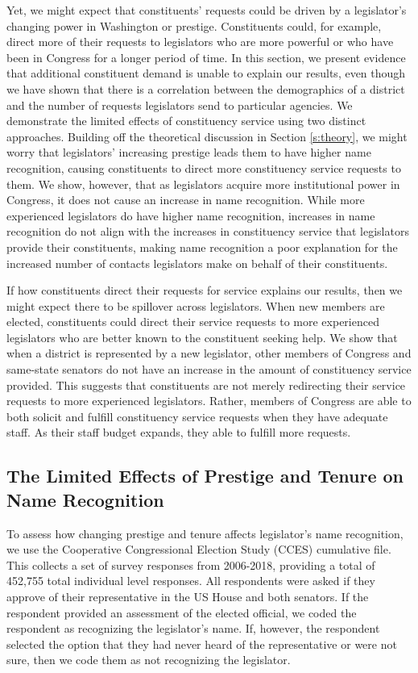 \documentclass[12pt]{article}
\begin{document}
Yet, we might expect that constituents' requests could be driven by a legislator's changing power in Washington or prestige. Constituents could, for example, direct more of their requests to legislators who are more powerful or who have been in Congress for a longer period of time. In this section, we present evidence that additional constituent demand is unable to explain our results, even though we have shown that there is a correlation between the demographics of a district and the number of requests legislators send to particular agencies. We demonstrate the limited effects of constituency service using two distinct approaches. Building off the theoretical discussion in Section \ref{s:theory}, we might worry that legislators' increasing prestige leads them to have higher name recognition, causing constituents to direct more constituency service requests to them. We show, however, that as legislators acquire more institutional power in Congress, it does not cause an increase in name recognition. While more experienced legislators do have higher name recognition, increases in name recognition do not align with the increases in constituency service that legislators provide their constituents, making name recognition a poor explanation for the increased number of contacts legislators make on behalf of their constituents.  

If how constituents direct their requests for service explains our results, then we might expect there to be spillover across legislators. When new members are elected, constituents could direct their service requests to more experienced legislators who are better known to the constituent seeking help. We show that when a district is represented by a new legislator, other members of Congress and same-state senators do not have an increase in the amount of constituency service provided. This suggests that constituents are not merely redirecting their service requests to more experienced legislators. Rather, members of Congress are able to both solicit and fulfill constituency service requests when they have adequate staff. As their staff budget expands, they able to fulfill more requests.  

\subsection{The Limited Effects of Prestige and Tenure on Name Recognition}
To assess how changing prestige and tenure affects legislator's name recognition, we use the Cooperative Congressional Election Study (CCES) cumulative file. This collects a set of survey responses from 2006-2018, providing a total of 452,755 total individual level responses. All respondents were asked if they approve of their representative in the US House and both senators. If the respondent provided an assessment of the elected official, we coded the respondent as recognizing the legislator's name. If, however, the respondent selected the option that they had never heard of the representative or were not sure, then we code them as not recognizing the legislator.  
\end{document}
